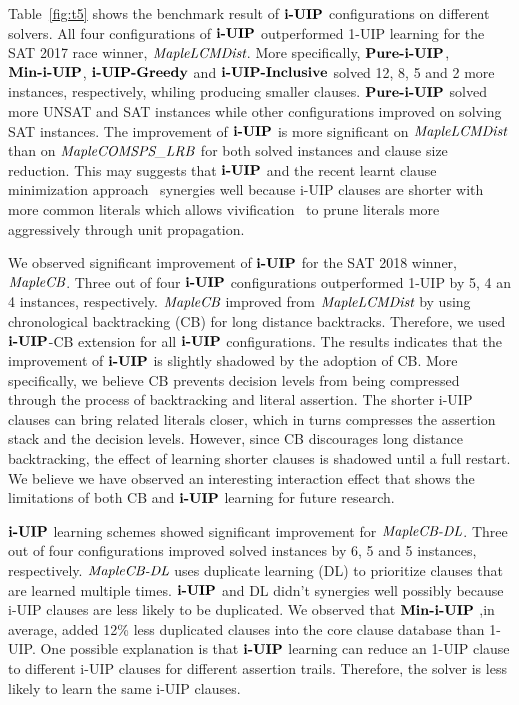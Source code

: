 Table~\ref{fig:t5} shows the benchmark result of $\textbf{i-UIP}$ configurations on different solvers. All four configurations of $\textbf{i-UIP}$ outperformed 1-UIP learning for the SAT 2017 race winner, $\textit{MapleLCMDist}$. More specifically, $\textbf{Pure-i-UIP}$, $\textbf{Min-i-UIP}$, $\textbf{i-UIP-Greedy}$ and $\textbf{i-UIP-Inclusive}$ solved 12, 8, 5 and 2 more instances, respectively, whiling producing smaller clauses. $\textbf{Pure-i-UIP}$ solved more UNSAT and SAT instances while other configurations improved on solving SAT instances.  The improvement of $\textbf{i-UIP}$ is more significant on $\textit{MapleLCMDist}$ than on $\textit{MapleCOMSPS\_LRB}$ for both solved instances and clause size reduction. This may suggests that $\textbf{i-UIP}$ and the recent learnt clause minimization approach~\cite{} synergies well because i-UIP clauses are shorter with more common literals which allows vivification~\cite{} to prune literals more aggressively through unit propagation. 

We observed significant improvement of $\textbf{i-UIP}$ for the SAT 2018 winner, $\textit{MapleCB}$. Three out of four $\textbf{i-UIP}$ configurations outperformed 1-UIP by 5, 4 an 4 instances, respectively. $\textit{MapleCB}$ improved from $\textit{MapleLCMDist}$ by using chronological backtracking (CB) for long distance backtracks. Therefore, we used $\textbf{i-UIP}$-CB extension for all $\textbf{i-UIP}$ configurations. The results indicates that the improvement of $\textbf{i-UIP}$ is slightly shadowed by the adoption of CB. More specifically, we believe CB prevents decision levels from being compressed through the process of backtracking and literal assertion. The shorter i-UIP clauses can bring related literals closer, which in turns compresses the assertion stack and the decision levels. However, since CB discourages long distance backtracking, the effect of learning shorter clauses is shadowed until a full restart.  We believe we have observed an interesting interaction effect that shows the limitations of both CB and $\textbf{i-UIP}$ learning for future research.  

$\textbf{i-UIP}$ learning schemes showed significant improvement for $\textit{MapleCB-DL}$. Three out of four configurations improved solved instances by 6, 5 and 5 instances, respectively. $\textit{MapleCB-DL}$ uses duplicate learning (DL) to prioritize clauses that are learned multiple times. $\textbf{i-UIP}$ and DL didn't synergies well possibly because i-UIP clauses are less likely to be duplicated. We observed that $\textbf{Min-i-UIP}$ ,in average, added 12\% less duplicated clauses into the core clause database than 1-UIP. One possible explanation is that $\textbf{i-UIP}$ learning can reduce an 1-UIP clause to different i-UIP clauses for different assertion trails. Therefore, the solver is less likely to learn the same i-UIP clauses.

